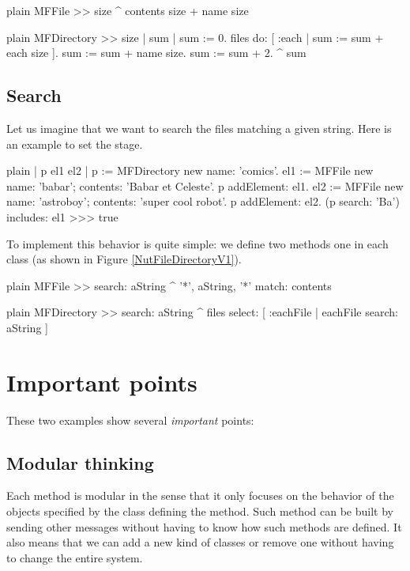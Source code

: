 \documentclass[10pt,twoside,english]{_support/latex/sbabook/sbabook}
\begin{document}
\begin{displaycode}{plain}
MFFile >> size
	^ contents size + name size
\end{displaycode}

\begin{displaycode}{plain}
MFDirectory >> size
	| sum |
	sum := 0.
	files do: [ :each | sum := sum + each size ].
	sum := sum + name size.
	sum := sum + 2.
	^ sum
\end{displaycode}
\subsection{Search }
Let us imagine that we want to search the files matching a given string. 
Here is an example to set the stage.

\begin{displaycode}{plain}
| p el1 el2 |
p := MFDirectory new name: 'comics'.
el1 := MFFile new name: 'babar'; contents: 'Babar et Celeste'.
p addElement: el1.
el2 := MFFile new name: 'astroboy'; contents: 'super cool robot'.
p addElement: el2.
(p search: 'Ba') includes: el1
>>> true
\end{displaycode}

To implement this behavior is quite simple: we define two methods one in each class (as shown in Figure \ref{NutFileDirectoryV1}).

\begin{displaycode}{plain}
MFFile >> search: aString
	^ '*', aString, '*' match: contents
\end{displaycode}

\begin{displaycode}{plain}
MFDirectory >> search: aString
	^ files select: [ :eachFile | eachFile search: aString ]
\end{displaycode}
\section{Important points}
These two examples show several \textit{important} points:
\subsection{Modular thinking}
Each method is modular in the sense that it only focuses on the behavior of the objects specified by the class defining the method. Such method can be built by sending other messages without having to know how such methods are defined.
It also means that we can add a new kind of classes or remove one without having to change the entire system.
\end{document}
